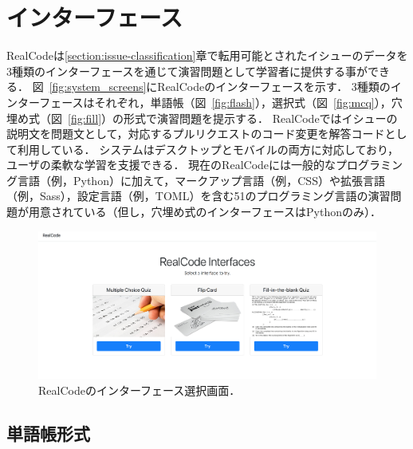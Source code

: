 \def\vector#1{\mbox{\boldmath $#1$}}

\chapter[インターフェース]{インターフェース}
\graphicspath{{Chapters_implementation/Figs/}}



RealCodeは\ref{section:issue-classification}章で転用可能とされたイシューのデータを3種類のインターフェースを通じて演習問題として学習者に提供する事ができる．
図~\ref{fig:system_screens}にRealCodeのインターフェースを示す．
3種類のインターフェースはそれぞれ，単語帳（図~\ref{fig:flash}），選択式（図~\ref{fig:mcq}），穴埋め式（図~\ref{fig:fill}）の形式で演習問題を提示する．
RealCodeではイシューの説明文を問題文として，対応するプルリクエストのコード変更を解答コードとして利用している．
システムはデスクトップとモバイルの両方に対応しており，ユーザの柔軟な学習を支援できる\cite{gassler2004integrated}．
現在のRealCodeには一般的なプログラミング言語（例，Python）に加えて，マークアップ言語（例，CSS）や拡張言語（例，Sass），設定言語（例，TOML）を含む51のプログラミング言語の演習問題が用意されている（但し，穴埋め式のインターフェースはPythonのみ）．

\begin{figure}[H]
	\centering
  \includegraphics[width=1.0\columnwidth]{20181228-realcode-interfaces-select.png}
  \caption{RealCodeのインターフェース選択画面．}
  \label{fig:interface-selector}
\end{figure}


\section{単語帳形式}

